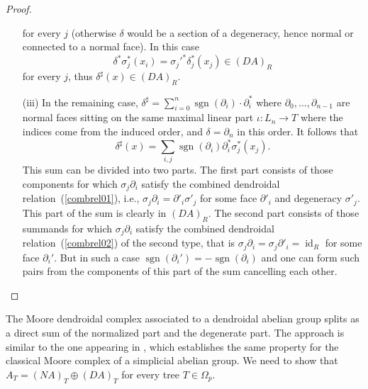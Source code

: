 \documentclass[a4paper]{amsart}
\theoremstyle{plain}
\theoremstyle{definition}
\theoremstyle{remark}
\DeclareMathOperator{\sgn}{sgn}
\DeclareMathOperator{\id}{id}
\newcommand{\rpd}{\Omega_p}
\newcommand{\To}{\longrightarrow}
\numberwithin{equation}{section}
\numberwithin{figure}{section}
\begin{document}
\begin{proof}
\begin{itemize}
\[\]
for every $j$ (otherwise $\delta$ would be a section of a degeneracy, hence normal or connected to a normal face). In this case
\[
\delta^*\sigma_j^*(x_i)=\sigma_j'^*\delta_j^*(x_j)\in (DA)_R
\]
for every $j$, thus $\delta^\sharp(x)\in (DA)_R$.
\item[{\rm (iii)}] In the remaining case, $\delta^\sharp=\sum_{i=0}^n\sgn(\partial_i)\cdot\partial_i^*$ where $\partial_0,\ldots,\partial_{n-1}$ are normal faces sitting on the same maximal linear part $\iota\colon L_n\To T$ where the indices come from the induced order, and $\delta=\partial_n$ in this order. It follows that
\[
\delta^\sharp(x)=\sum_{i,j}\sgn(\partial_i)\partial_i^*\sigma_j^*(x_j).
\]
This sum can be divided into two parts. The first part consists of those components for which $\sigma_j\partial_i$ satisfy the combined dendroidal relation~(\ref{combrel01}), i.e., $\sigma_j\partial_i=\partial'_i\sigma'_j$ for some face $\partial'_i$ and degeneracy $\sigma'_j$. This part of the sum is clearly in $(DA)_R$. The second part consists of those summands for which $\sigma_j\partial_i$ satisfy the combined dendroidal
relation~(\ref{combrel02}) of the second type, that is $\sigma_j\partial_i=\sigma_j\partial'_i=\id_R$ for some face $\partial_i'$. But in such a case $\sgn(\partial_i')=-\sgn(\partial_i)$ and one can form such pairs from the
components of this part of the sum cancelling each other.
\end{itemize}
\end{proof}

The Moore dendroidal complex associated to a dendroidal abelian group splits as a direct sum of the normalized part and the degenerate part. The approach is similar to the one appearing in \cite{weibel}, which establishes the same property for the classical Moore complex of a simplicial abelian group. We need to show that $A_T=(NA)_T\oplus (DA)_T$ for every tree $T\in\rpd$.
\end{document}
